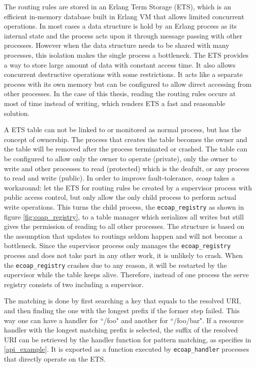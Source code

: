 The routing rules are stored in an Erlang Term Storage (ETS), which is an efficient in-memory database built in Erlang VM that allows limited concurrent operations. In most cases a data structure is hold by an Erlang process as its internal state and the process acts upon it through message passing with other processes. However when the data structure needs to be shared with many processes, this isolation makes the single process a bottleneck. The ETS provides a way to store large amount of data with constant access time. It also allows concurrent destructive operations with some restrictions. It acts like a separate process with its own memory but can be configured to allow direct accessing from other processes. In the case of this thesis, reading the routing rules occurs at most of time instead of writing, which renders ETS a fast and reasonable solution. 
 
A ETS table can not be linked to or monitored as normal process, but has the concept of ownership. The process that creates the table becomes the owner and the table will be removed after the process terminated or crashed. The table can be configured to allow only the owner to operate (private), only the owner to write and other processes to read (protected) which is the deafult, or any process to read and write (public). In order to improve fault-tolerance, \textit{ecoap} takes a workaround: let the ETS for routing rules be created by a supervisor process with public access control, but only allow the only child process to perform actual write operations. This turns the child process, the \verb|ecoap_registry| as shown in figure \ref{fig:coap_registry}, to a table manager which serializes all writes but still gives the permission of reading to all other processes. The structure is based on the assumption that updates to routings seldom happen and will not become a bottleneck. Since the supervisor process only manages the \verb|ecoap_registry| process and does not take part in any other work, it is unlikely to crash. When the \verb|ecoap_registry| crashes due to any reason, it will be restarted by the supervisor while the table keeps alive. Therefore, instead of one process the serve registry consists of two including a supervisor. 

The matching is done by first searching a key that equals to the resolved URI, and then finding the one with the longest prefix if the former step failed. This way one can have a handler for ``/foo" and another for ``/foo/bar". If a resource handler with the longest matching prefix is selected, the suffix of the resolved URI can be retrieved by the handler function for pattern matching, as specifies in \ref{api_example}. It is exported as a function executed by \verb|ecoap_handler| processes that directly operate on the ETS. 

